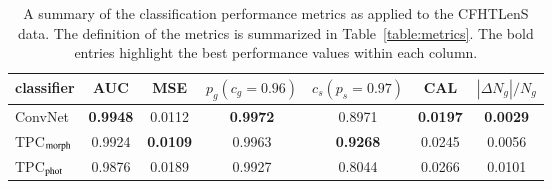 \documentclass[fleqn,usenatbib]{mnras}
\begin{document}
\begin{table}
  \caption{
    A summary of the classification performance metrics
    as applied to the CFHTLenS data.
    The definition of the metrics is summarized in Table~\ref{table:metrics}.
    The bold entries highlight the best performance values within each column.
  }
  \centering
  \begin{tabular}{l c c c c c c}
    \hline
    classifier & AUC & MSE & $p_{g}(c_g=0.96)$ & $c_{s}(p_s=0.97)$ & CAL & $ |\Delta N_g|/N_g$ \\
    \hline
    ConvNet                       & \textbf{0.9948} & 0.0112          & \textbf{0.9972} & 0.8971          & \textbf{0.0197}  & \textbf{0.0029} \\
    TPC${}_{{\mathrm{morph}}}$         & 0.9924          & \textbf{0.0109} & 0.9963          & \textbf{0.9268} & 0.0245           & 0.0056 \\
    TPC${}_{{\mathrm{phot}}}$          & 0.9876          & 0.0189          & 0.9927          & 0.8044          & 0.0266           & 0.0101 \\
    \hline
  \end{tabular}
  \label{table:clens_metrics}
\end{table}
\end{document}
